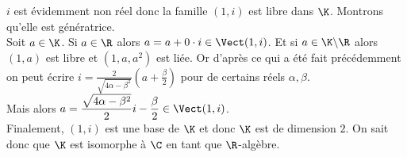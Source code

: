 \documentclass[8pt]{book}
\begin{document}
\begin{enumerate}[leftmargin=*]
		$i$ est évidemment non réel donc la famille $(1,i)$ est libre dans $\K$. Montrons qu'elle est génératrice.\\
		Soit $a\in \K$. Si $a\in \R$ alors $a=a+0\cdot i\in \Vect(1,i)$. Et si $a\in \K\backslash \R$ alors $(1,a)$ est libre et $(1,a,a^2)$ est liée. Or d'après ce qui a été fait précédemment on peut écrire $i=\displaystyle\frac{2}{\sqrt{4\alpha-\beta^2}}\left(a+\frac{\beta}{2}\right)$ pour de certains réels $\alpha,\beta$.\\
		Mais alors $a=\displaystyle\frac{\sqrt{4\alpha-\beta^2}}{2}i-\frac{\beta}{2}\in \Vect(1,i)$.\\
		Finalement, $(1,i)$ est une base de $\K$ et donc $\K$ est de dimension $2$. On sait donc que $\K$ est isomorphe à $\C$ en tant que $\R$-algèbre.
	\end{enumerate}
	
\end{document}
